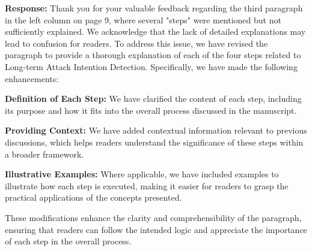 \documentclass[a4paper,twoside,11pt,dvipsnames]{reviewresponse}
\begin{document}
\textbf{Response:} Thank you for your valuable feedback regarding the third paragraph in the left column on page 9, where several "steps" were mentioned but not sufficiently explained. We acknowledge that the lack of detailed explanations may lead to confusion for readers.
To address this issue, we have revised the paragraph to provide a thorough explanation of each of the four steps related to Long-term Attack Intention Detection. Specifically, we have made the following enhancements:

\textbf{Definition of Each Step:} We have clarified the content of each step, including its purpose and how it fits into the overall process discussed in the manuscript.

\textbf{Providing Context:} We have added contextual information relevant to previous discussions, which helps readers understand the significance of these steps within a broader framework.

\textbf{Illustrative Examples:} Where applicable, we have included examples to illustrate how each step is executed, making it easier for readers to grasp the practical applications of the concepts presented.

These modifications enhance the clarity and comprehensibility of the paragraph, ensuring that readers can follow the intended logic and appreciate the importance of each step in the overall process.





\end{document}
